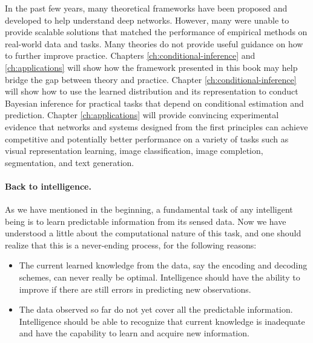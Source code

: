 \documentclass[\toplevelprefix/book-main.tex]{subfiles}
\begin{document}
In the past few years, many theoretical frameworks have been proposed and developed to help understand deep networks. However, many were unable to provide scalable solutions that matched the performance of empirical methods on real-world data and tasks. Many theories do not provide useful guidance on how to further improve practice. Chapters \ref{ch:conditional-inference} and  \ref{ch:applications} will show how the framework presented in this book may help bridge the gap between theory and practice. Chapter \ref{ch:conditional-inference} will show how to use the learned distribution and its representation to conduct Bayesian inference for practical tasks that depend on conditional estimation and prediction. Chapter \ref{ch:applications} will provide convincing experimental evidence that networks and systems designed from the first principles can achieve competitive and potentially better performance on a variety of tasks such as visual representation learning,  image classification, image completion, segmentation, and text generation.


\paragraph{Back to intelligence.}
As we have mentioned in the beginning, a fundamental task of any intelligent being is to learn predictable information from its sensed data. Now we have understood a little about the computational nature of this task, and one should realize that this is a never-ending process, for the following reasons:
\begin{itemize}
    \item The current learned knowledge from the data, say the encoding and decoding schemes, can never really be optimal. Intelligence should have the ability to improve if there are still errors in predicting new observations. 
    \item The data observed so far do not yet cover all the predictable information. Intelligence should be able to recognize that current knowledge is inadequate and have the capability to learn and acquire new information.
\end{itemize}
\end{document}
